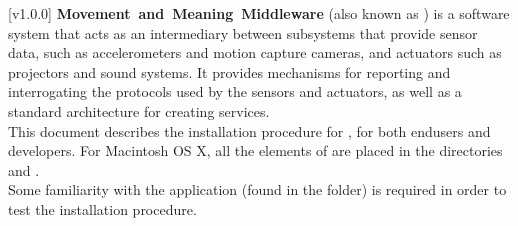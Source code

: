 [v1.0.0]
\textbf{Movement~and~Meaning~Middleware} (also known as \mplusm{}) is a software system
that acts as an intermediary between subsystems that provide sensor data, such as
accelerometers and motion capture cameras, and actuators such as projectors and sound
systems.
It provides mechanisms for reporting and interrogating the protocols used by the sensors
and actuators, as well as a standard architecture for creating services.\\

This document describes the installation procedure for \mplusm{}, for both
end\longDash{}users and developers.
For Macintosh OS X, all the elements of \mplusm{} are placed in the directories
 and .\\

Some familiarity with the  application (found in the
 folder) is required in order to test the installation
procedure.
\primaryEnd{}
